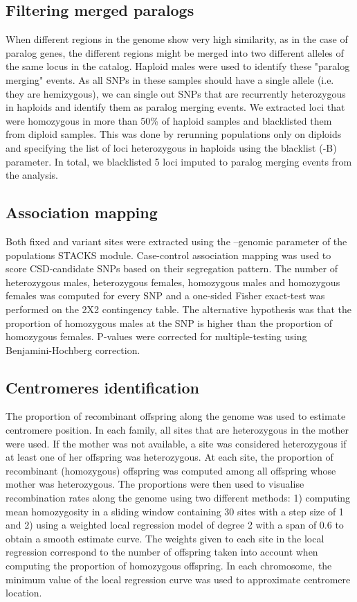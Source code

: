 \documentclass[11pt,a4paper]{report}
\begin{document}
\subsection{Filtering merged paralogs}
When different regions in the genome show very high similarity, as in the case of paralog genes, the different regions might be merged into two different alleles of the same locus in the catalog. Haploid males were used to identify these "paralog merging" events. As all SNPs in these samples should have a single allele (i.e. they are hemizygous), we can single out SNPs that are recurrently heterozygous in haploids and identify them as paralog merging events. We extracted loci that were homozygous in more than 50\% of haploid samples and blacklisted them from diploid samples. This was done by rerunning populations only on diploids and specifying the list of loci heterozygous in haploids using the blacklist  (-B) parameter. In total, we blacklisted 5 loci imputed to paralog merging events from the analysis.

\subsection{Association mapping}
Both fixed and variant sites were extracted using the --genomic parameter of the populations STACKS module. Case-control association mapping was used to score CSD-candidate SNPs based on their segregation pattern. The number of heterozygous males, heterozygous females, homozygous males and homozygous females was computed for every SNP and a one-sided Fisher exact-test was performed on the 2X2 contingency table. The alternative hypothesis was that the proportion of homozygous males at the SNP is higher than the proportion of homozygous females. P-values were corrected for multiple-testing using Benjamini-Hochberg correction. 


\subsection{Centromeres identification}
The proportion of recombinant offspring along the genome was used to estimate centromere position. In each family, all sites that are heterozygous in the mother were used. If the mother was not available, a site was considered heterozygous if at least one of her offspring was heterozygous. At each site, the proportion of recombinant (homozygous) offspring was computed among all offspring whose mother was heterozygous. The proportions were then used to visualise recombination rates along the genome using two different methods: 1) computing mean homozygosity in a sliding window containing 30 sites with a step size of 1 and 2) using a weighted local regression model of degree 2 with a span of 0.6 to obtain a smooth estimate curve. The weights given to each site in the local regression correspond to the number of offspring taken into account when computing the proportion of homozygous offspring. In each chromosome, the minimum value of the local regression curve was used to approximate centromere location.
\end{document}
